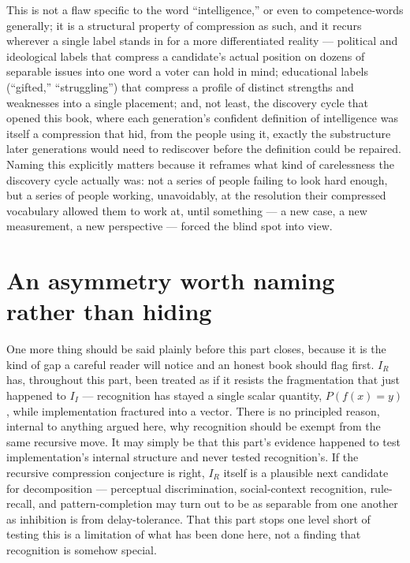 This is not a flaw specific to the word ``intelligence,'' or even to competence-words generally; it is a structural property of compression as such, and it recurs wherever a single label stands in for a more differentiated reality --- political and ideological labels that compress a candidate's actual position on dozens of separable issues into one word a voter can hold in mind; educational labels (``gifted,'' ``struggling'') that compress a profile of distinct strengths and weaknesses into a single placement; and, not least, the discovery cycle that opened this book, where each generation's confident definition of intelligence was itself a compression that hid, from the people using it, exactly the substructure later generations would need to rediscover before the definition could be repaired. Naming this explicitly matters because it reframes what kind of carelessness the discovery cycle actually was: not a series of people failing to look hard enough, but a series of people working, unavoidably, at the resolution their compressed vocabulary allowed them to work at, until something --- a new case, a new measurement, a new perspective --- forced the blind spot into view.

\section{An asymmetry worth naming rather than hiding}

One more thing should be said plainly before this part closes, because it is the kind of gap a careful reader will notice and an honest book should flag first. $I_R$ has, throughout this part, been treated as if it resists the fragmentation that just happened to $I_I$ --- recognition has stayed a single scalar quantity, $P(f(x)=y)$, while implementation fractured into a vector. There is no principled reason, internal to anything argued here, why recognition should be exempt from the same recursive move. It may simply be that this part's evidence happened to test implementation's internal structure and never tested recognition's. If the recursive compression conjecture is right, $I_R$ itself is a plausible next candidate for decomposition --- perceptual discrimination, social-context recognition, rule-recall, and pattern-completion may turn out to be as separable from one another as inhibition is from delay-tolerance. That this part stops one level short of testing this is a limitation of what has been done here, not a finding that recognition is somehow special.
